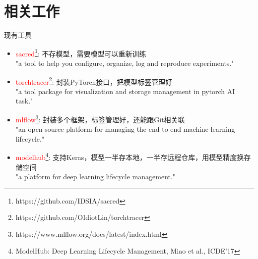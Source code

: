 \documentclass{beamer}
\begin{document}
\section{相关工作}

\begin{frame}{现有工具}
\begin{itemize}
    \item \textcolor{red}{sacred\footnote{https://github.com/IDSIA/sacred}}: 不存模型，需要模型可以重新训练\\ {\small"a tool to help you configure, organize, log and reproduce experiments."}
    \item \textcolor{red}{torchtracer\footnote{https://github.com/OIdiotLin/torchtracer}}: 封装PyTorch接口，把模型标签管理好\\ {\small "a tool package for visualization and storage management in pytorch AI task."}
    \item \textcolor{red}{mlflow\footnote{https://www.mlflow.org/docs/latest/index.html}}: 封装多个框架，标签管理好，还能跟Git相关联\\ {\small "an open source platform for managing the end-to-end machine learning lifecycle."}
    \item \textcolor{red}{modelhub\footnote{ModelHub: Deep Learning Lifecycle Management, Miao et al., ICDE'17}}: 支持Keras，模型一半存本地，一半存远程仓库，用模型精度换存储空间\\ {\small "a platform for deep learning lifecycle management."}
\end{itemize}
\end{frame}

\end{document}
